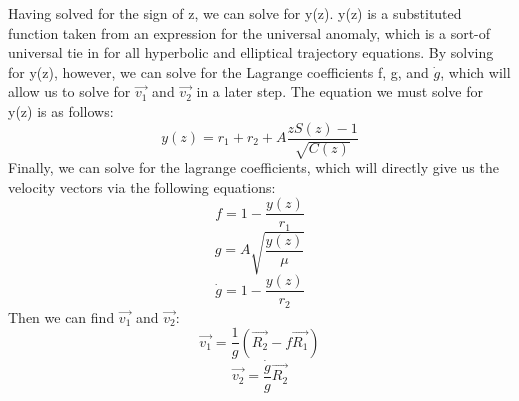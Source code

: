 \documentclass{article}
\numberwithin{figure}{section}
\begin{document}
Having solved for the sign of z, we can solve for y(z). y(z) is a substituted function taken from an expression for the universal anomaly, which is a sort-of universal tie in for all hyperbolic and elliptical trajectory equations. By solving for y(z), however, we can solve for the Lagrange coefficients f, g, and \(\dot{g}\), which will allow us to solve for \(\vec{v_1}\) and \(\vec{v_2}\) in a later step. The equation we must solve for y(z) is as follows: 
\[
y(z) = r_1 + r_2 + A \frac{z S(z) - 1}{\sqrt{C(z)}}
\]
Finally, we can solve for the lagrange coefficients, which will directly give us the velocity vectors via the following equations:
\[
f = 1 - \frac{y(z)}{r_1}
\]
\[
g = A \sqrt{\frac{y(z)}{\mu}}
\]
\[
\dot{g} = 1 - \frac{y(z)}{r_2}
\]
Then we can find \(\vec{v_1}\) and \(\vec{v_2}\):
\[
\vec{v_1} = \frac{1}{g} \left( \vec{R_2} - f \vec{R_1}\right)
\]
\[
\vec{v_2} = \frac{\dot{g}}{g} \vec{R_2}
\]
\end{document}
